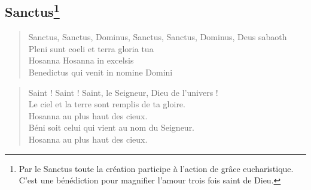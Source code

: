 \subsection*{Sanctus\footnote{Par le Sanctus toute la création participe à l'action de grâce            
eucharistique. C'est une bénédiction pour magnifier l'amour trois fois
saint de Dieu.}}

{\bf
\begin{minipage}[t]{0.5\textwidth}
\begin{verse}
Sanctus, Sanctus, Dominus, Sanctus, Sanctus, Dominus, Deus sabaoth \\
Pleni sunt coeli et terra gloria tua \\
Hosanna Hosanna in excelsis \\
Benedictus qui venit in nomine Domini \\
\end{verse}
\end{minipage}
\begin{minipage}[t]{0.5\textwidth}
\begin{verse}
Saint ! Saint ! Saint, le Seigneur, Dieu de l'univers !\\
Le ciel et la terre sont remplis de ta gloire.\\
Hosanna au plus haut des cieux.\\
Béni soit celui qui vient au nom du Seigneur.\\
Hosanna au plus haut des cieux.
\end{verse}
\end{minipage}
}




